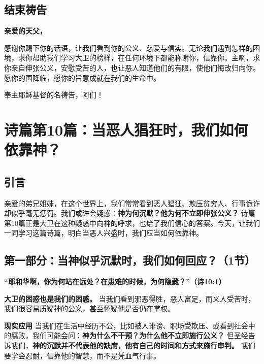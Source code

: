 \documentclass[a4paper, 12pt]{article}
\begin{document}
\subsection*{结束祷告}

\textbf{亲爱的天父，}

感谢你赐下你的话语，让我们看到你的公义、慈爱与信实。无论我们遇到怎样的困境，求你帮助我们学习大卫的榜样，在任何环境下都能称谢你，信靠你。主啊，求你亲自伸张公义，安慰受苦的人，也让恶人知道他们的有限，使他们悔改归向你。愿你的国降临，愿你的旨意成就在我们的生命中。

奉主耶稣基督的名祷告，阿们！

\newpage
\section{诗篇第10篇：当恶人猖狂时，我们如何依靠神？}
\subsection*{引言}

亲爱的弟兄姐妹，在这个世界上，我们常常看到恶人猖狂、欺压贫穷人、行事诡诈却似乎毫无惩罚。我们或许会疑惑：\textbf{神为何沉默？他为何不立即伸张公义？} 诗篇第10篇正是大卫在这种疑惑中向神的呼求，也给了我们信心的答案。今天，让我们一同学习这篇诗篇，明白当恶人兴盛时，我们应当如何依靠神。



\subsection*{第一部分：当神似乎沉默时，我们如何回应？（1节）}


\textbf{“耶和华啊，你为何站在远处？在患难的时候，为何隐藏？”（诗10:1）  }

\vspace{0.2cm}

\textbf{大卫的困惑也是我们的困惑。} 当我们看到邪恶得胜，恶人富足，而义人受苦时，我们很容易质疑神的公义，甚至怀疑他是否仍在掌权。  

\vspace{0.2cm}

\textbf{现实应用}
当我们在生活中经历不公，比如被人诽谤、职场受欺压、或看到社会中的腐败，我们可能会问：\textbf{神为什么不干预？为什么他不立即施行公义？} 但圣经告诉我们，\textbf{神的沉默并不代表他的缺席，他有自己的时间和方式来施行审判。} 我们要学会忍耐，信靠他的智慧，而不是凭血气行事。  
\end{document}
